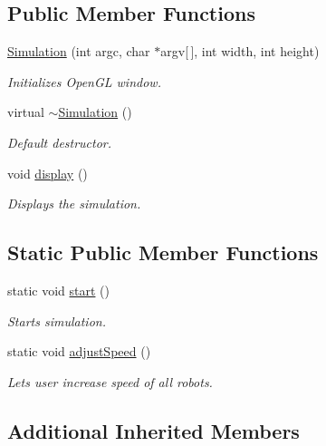 \subsection*{Public Member Functions}
\begin{DoxyCompactItemize}
\item 
\hyperlink{classSimulation_a4c669ceaa34c7130966ce45f9de75fbe}{Simulation} (int argc, char $\ast$argv\mbox{[}$\,$\mbox{]}, int width, int height)
\begin{DoxyCompactList}\small\item\em Initializes Open\-G\-L window. \end{DoxyCompactList}\item 
\hypertarget{classSimulation_a80fad3f57dfaf195a36f7bc49bc88279}{virtual \hyperlink{classSimulation_a80fad3f57dfaf195a36f7bc49bc88279}{$\sim$\-Simulation} ()}\label{classSimulation_a80fad3f57dfaf195a36f7bc49bc88279}

\begin{DoxyCompactList}\small\item\em Default destructor. \end{DoxyCompactList}\item 
void \hyperlink{classSimulation_a449dcb7d97dfba99efe770de2f399c31}{display} ()
\begin{DoxyCompactList}\small\item\em Displays the simulation. \end{DoxyCompactList}\end{DoxyCompactItemize}
\subsection*{Static Public Member Functions}
\begin{DoxyCompactItemize}
\item 
static void \hyperlink{classSimulation_acf598e815ded8ca12cad5db975ac8849}{start} ()
\begin{DoxyCompactList}\small\item\em Starts simulation. \end{DoxyCompactList}\item 
static void \hyperlink{classSimulation_a685b3dae9c7d04df7783e2f029e3dec0}{adjust\-Speed} ()
\begin{DoxyCompactList}\small\item\em Lets user increase speed of all robots. \end{DoxyCompactList}\end{DoxyCompactItemize}
\subsection*{Additional Inherited Members}


